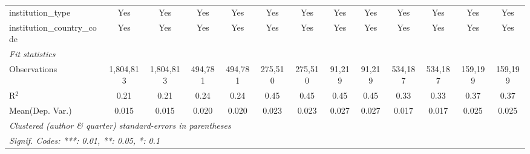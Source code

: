 \begin{tabular}{lcccccccccccc}
   institution\_type                        & Yes            & Yes            & Yes            & Yes            & Yes            & Yes            & Yes            & Yes           & Yes            & Yes            & Yes            & Yes\\  
   institution\_country\_code               & Yes            & Yes            & Yes            & Yes            & Yes            & Yes            & Yes            & Yes           & Yes            & Yes            & Yes            & Yes\\  
   \midrule
   \emph{Fit statistics}\\
   Observations                             & 1,804,813      & 1,804,813      & 494,781        & 494,781        & 275,510        & 275,510        & 91,219         & 91,219        & 534,187        & 534,187        & 159,199        & 159,199\\  
   R$^2$                                    & 0.21           & 0.21           & 0.24           & 0.24           & 0.45           & 0.45           & 0.45           & 0.45          & 0.33           & 0.33           & 0.37           & 0.37\\  
Mean(Dep. Var.) & 0.015 & 0.015 & 0.020 & 0.020 & 0.023 & 0.023 & 0.027 & 0.027 & 0.017 & 0.017 & 0.025 & 0.025 \\
   \midrule \midrule
   \multicolumn{13}{l}{\emph{Clustered (author \& quarter) standard-errors in parentheses}}\\
   \multicolumn{13}{l}{\emph{Signif. Codes: ***: 0.01, **: 0.05, *: 0.1}}\\
\end{tabular}
\par\endgroup
